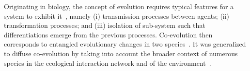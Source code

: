 \documentclass[11pt]{article}
\begin{document}
Originating in biology, the concept of evolution requires typical features for a system to exhibit it~\citep{durham1991coevolution}, namely (i) transmission processes between agents; (ii) transformation processes; and (iii) isolation of sub-system such that differentiations emerge from the previous processes. Co-evolution then corresponds to entangled evolutionary changes in two species~\citep{janzen1980coevolution}. It was generalized to diffuse co-evolution by taking into account the broader context of numerous species in the ecological interaction network and of the environment~\citep{strauss2005toward}.
\end{document}

